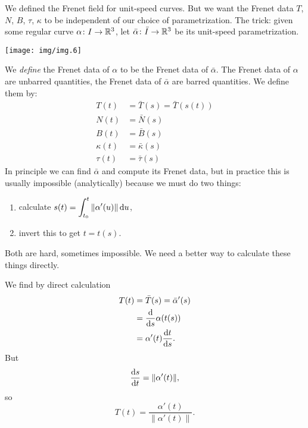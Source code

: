 \M
We defined the Frenet field for unit-speed curves. But we want the
Frenet data $T$, $N$, $B$, $\tau$, $\kappa$ to be independent of our
choice of parametrization. The trick: given some regular curve
$\alpha\colon I\to\mathbb{R}^{3}$, let $\bar{\alpha}\colon \bar{I}\to\mathbb{R}^{3}$
be its unit-speed parametrization. 
\begin{center}
  \texttt{[image: img/img.6]}
\end{center}
We \emph{define} the Frenet data of $\alpha$ to be the Frenet data of
$\bar{\alpha}$. The Frenet data of $\alpha$ are unbarred quantities, the
Frenet data of $\bar{\alpha}$ are barred quantities. We define them by:
\begin{subequations}
  \begin{align}
    T(t) &= \bar{T}(s) = \bar{T}(s(t))\\
    N(t) &= \bar{N}(s)\\
    B(t) &= \bar{B}(s)\\
    \kappa(t) &= \bar{\kappa}(s)\\
    \tau(t) &= \bar{\tau}(s)
  \end{align}
\end{subequations}
In principle we can find $\bar{\alpha}$ and compute its Frenet data, but
in practice this is usually impossible (analytically) because we must do
two things:
\begin{enumerate}
\item calculate $\displaystyle s(t)=\int^{t}_{t_{0}}\|\alpha'(u)\|\,\mathrm{d} u$,
\item invert this to get $t = t(s)$.
\end{enumerate}
Both are hard, sometimes impossible. We need a better way to calculate
these things directly.

We find by direct calculation
\begin{subequations}
  \begin{align}
    T(t) &= \bar{T}(s) = \bar{\alpha}'(s)\\
    &= \frac{\mathrm{d}}{\mathrm{d} s}\alpha(t(s))\\
    &= \alpha'(t)\frac{\mathrm{d} t}{\mathrm{d} s}.
  \end{align}
\end{subequations}
But
\begin{equation}
\frac{\mathrm{d} s}{\mathrm{d} t}=\|\alpha'(t)\|,
\end{equation}
so
\begin{equation}
T(t) = \frac{\alpha'(t)}{\|\alpha'(t)\|}.
\end{equation}

